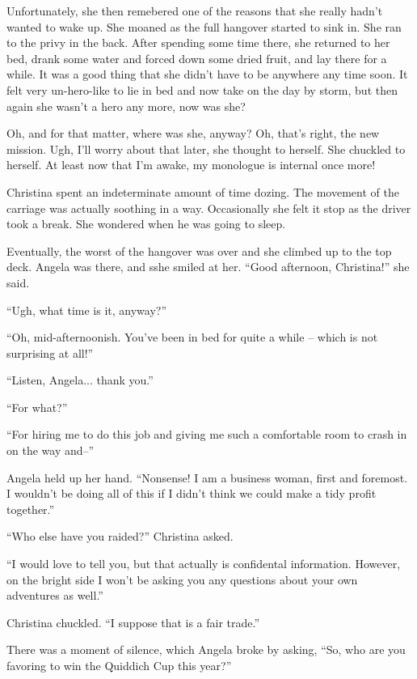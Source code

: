 \documentclass[showtrims,b6paper,draft,10pt]{memoir}
\begin{document}
Unfortunately, she then remebered one of the reasons that she really hadn't wanted to wake up.  She moaned as the full hangover started to sink in.  She ran to the privy in the back.  After spending some time there, she returned to her bed, drank some water and forced down some dried fruit, and lay there for a while.  It was a good thing that she didn't have to be anywhere any time soon.  It felt very un-hero-like to lie in bed and now take on the day by storm, but then again she wasn't a hero any more, now was she?

Oh, and for that matter, where was she, anyway?  Oh, that's right, the new mission.  Ugh, I'll worry about that later, she thought to herself.  She chuckled to herself.  At least now that I'm awake, my monologue is internal once more!

\timeskip

Christina spent an indeterminate amount of time dozing.  The movement of the carriage was actually soothing in a way.  Occasionally she felt it stop as the driver took a break.  She wondered when he was going to sleep.

Eventually, the worst of the hangover was over and she climbed up to the top deck.  Angela was there, and sshe smiled at her.  ``Good afternoon, Christina!''  she said.

``Ugh, what time is it, anyway?''

``Oh, mid-afternoonish.  You've been in bed for quite a while -- which is not surprising at all!''

``Listen, Angela... thank you.''

``For what?''

``For hiring me to do this job and giving me such a comfortable room to crash in on the way and--''

Angela held up her hand.  ``Nonsense!  I am a business woman, first and foremost.  I wouldn't be doing all of this if I didn't think we could make a tidy profit together.''

``Who else have you raided?''  Christina asked.

``I would love to tell you, but that actually is confidental information.  However, on the bright side I won't be asking you any questions about your own adventures as well.''

Christina chuckled.  ``I suppose that is a fair trade.''

There was a moment of silence, which Angela broke by asking, ``So, who are you favoring to win the Quiddich Cup this year?''
\end{document}
